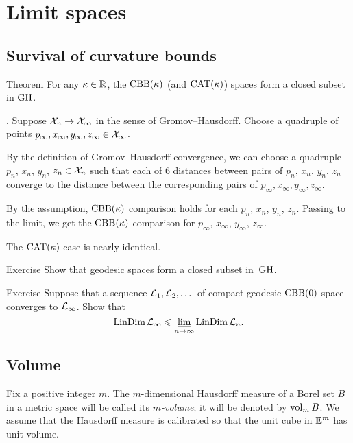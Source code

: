 \chapter{Limit spaces}\label{chap:lim}


\section{Survival of curvature bounds}

\begin{thm}{Theorem}\label{thm:CBB-closed}
For any $\kappa\in\mathbb{R}$, the $\mathrm{CBB}(\kappa)$ (and $\mathrm{CAT}(\kappa)$) spaces form a closed subset in $\operatorname{\rm GH}\nolimits$.
\end{thm}

.
Suppose $\mathcal{X}_n\to\mathcal{X}_\infty$ in the sense of Gromov--Hausdorff.
Choose a quadruple of points $p_\infty, x_\infty,y_\infty,z_\infty\in \mathcal{X}_\infty$.

By the definition of Gromov--Hausdorff convergence, we can choose a quadruple $p_n$,  $x_n$, $y_n$, $z_n\in \mathcal{X}_n$ such that each of 6 distances between pairs of $p_n$, $x_n$, $y_n$, $z_n$ converge to the distance between the corresponding pairs of $p_\infty, x_\infty,y_\infty,z_\infty$.

By the assumption, $\mathrm{CBB}(\kappa)$ comparison holds for each $p_n$, $x_n$, $y_n$, $z_n$.
Passing to the limit, we get the $\mathrm{CBB}(\kappa)$ comparison for $p_\infty$,  $x_\infty$, $y_\infty$, $z_\infty$.

The $\mathrm{CAT}(\kappa)$ case is nearly identical.
\qeds

\begin{thm}{Exercise}\label{ex:geod-closed}
Show that geodesic spaces form a closed subset in~$\operatorname{\rm GH}\nolimits$.
\end{thm}


\begin{thm}{Exercise}\label{ex:dim-lim}
Suppose that a sequence $\mathcal{L}_1,\mathcal{L}_2,\dots$ of compact geodesic $\mathrm{CBB}(0)$ space converges to $\mathcal{L}_\infty$.
Show that
\[\mathop{\rm LinDim}\nolimits \mathcal{L}_\infty\leqslant \varliminf_{n\to\infty} \mathop{\rm LinDim}\nolimits \mathcal{L}_n.\]
\end{thm}


\section{Volume}

Fix a positive integer $m$.
The $m$-dimensional Hausdorff measure of a Borel set $B$ in a metric space will be called its \emph{$m$-volume}; it will be denoted by $\operatorname{\rm vol}\nolimits_m B$.
We assume that the Hausdorff measure is calibrated so that the unit cube in $\mathbb{E}^m$ has unit volume.

